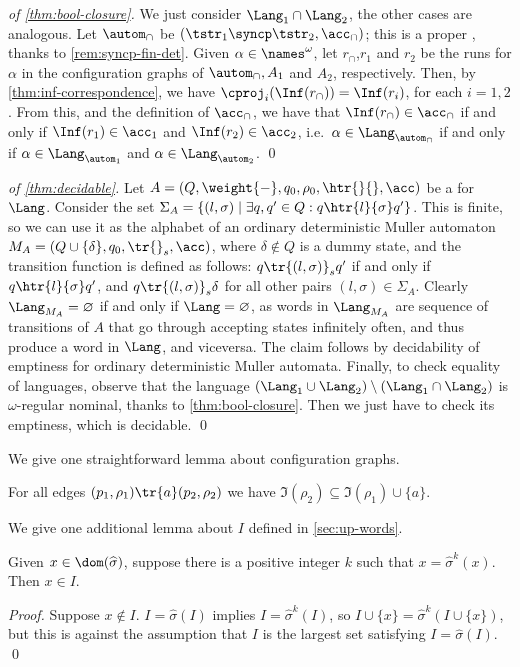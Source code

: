\begin{proof}[of \cref{thm:bool-closure}]
We just consider $\Lang_1 \cap \Lang_2$, the other cases are analogous. Let $\autom_\cap$ be $(\tstr_1 \syncp \tstr_2,\acc_\cap)$; this is a proper \hdma{}, thanks to \cref{rem:syncp-fin-det}. Given $\alpha \in \names^\omega$, let $r_\cap$,$r_1$ and $r_2$ be the runs for $\alpha$ in the configuration graphs of $\autom_\cap,A_1$ and $A_2$, respectively. Then, by \cref{thm:inf-correspondence}, we have $\cproj_i(\Inf(r_\cap)) = \Inf(r_i)$, for each $i=1,2$. From this, and the definition of $\acc_\cap$, we have that $\Inf(r_\cap) \in \acc_\cap$ if and only if $\Inf(r_1) \in \acc_1$ and $\Inf(r_2) \in \acc_2$, i.e.\ $\alpha \in \Lang_{\autom_\cap}$ if and only if $\alpha \in \Lang_{\autom_1}$ and $\alpha \in\Lang_{\autom_2}$.
\qed
\end{proof}
\begin{proof}[of \cref{thm:decidable}]
Let $A = (Q,\weight{-},q_0,\rho_0,\htr{}{},\acc)$ be a \hdma{} for $\Lang$. Consider the set $\Sigma_A = \{ (l,\sigma) \mid \exists q,q' \in Q : q \htr{l}{\sigma} q' \}$. This is finite, so we can use it as the alphabet of an ordinary deterministic Muller automaton $M_A = (Q \cup \{\delta\}, q_0,\tr{}_s,\acc)$, where $\delta \notin Q$ is a dummy state, and the transition function is defined as follows: $q \tr{(l,\sigma)}_s q'$ if and only if $q \htr{l}{\sigma} q'$, and $q \tr{(l,\sigma)}_s \delta$ for all other pairs $(l,\sigma) \in \Sigma_A$. Clearly $\Lang_{M_A} = \varnothing$ if and only if $\Lang = \varnothing$, as words in $\Lang_{M_A}$ are sequence of transitions of $A$ that go through accepting states infinitely often, and thus produce a word in $\Lang$, and viceversa. The claim follows by decidability of emptiness for ordinary deterministic Muller automata. Finally, to check equality of languages, observe that the language $(\Lang_1 \cup \Lang_2) \setminus (\Lang_1 \cap \Lang_2 )$ is $\omega$-regular nominal, thanks to \cref{thm:bool-closure}. Then we just have to check its emptiness, which is decidable.
\qed
\end{proof}
We give one straightforward lemma about configuration graphs.
\begin{lemma}
\label{lem:tr-names}
For all edges $(p_1,\rho_1) \tr{a} (p_2,\rho_2)$ we have $\Im(\rho_2) \subseteq \Im(\rho_1) \cup \{ a \}$.
\end{lemma}
We give one additional lemma about $I$ defined in \cref{sec:up-words}.
\begin{lemma}
\label{lem:xI}
Given $x \in \dom(\widehat{\sigma})$, suppose there is a positive integer $k$ such that $x = \widehat{\sigma}^k (x)$. Then $x \in I$.
\end{lemma}
\begin{proof}
Suppose $x \notin I$. $I = \widehat{\sigma}(I)$ implies $I = \widehat{\sigma}^k(I)$, so $I \cup \{x\} = \widehat{\sigma}^k(I \cup \{x\})$, but this is against the assumption that $I$ is the largest set satisfying $I = \widehat{\sigma}(I)$.
\qed
\end{proof}




